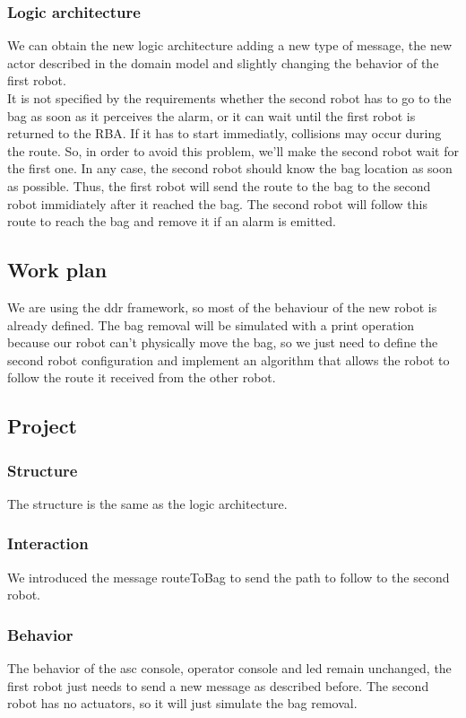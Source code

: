 \documentclass{llncs}
\begin{document}
\subsubsection{Logic architecture}
We can obtain the new logic architecture adding a new type of message, the new actor described in the domain model and slightly changing the behavior of the first robot.\\
It is not specified by the requirements whether the second robot has to go to the bag as soon as it perceives the alarm, or it can wait until the first robot is returned to the RBA. If it has to start immediatly, collisions may occur during the route. So, in order to avoid this problem, we'll make the second robot wait for the first one. In any case, the second robot should know the bag location as soon as possible. Thus, the first robot will send the route to the bag to the second robot immidiately after it reached the bag. The second robot will follow this route to reach the bag and remove it if an alarm is emitted.

\subsection{Work plan}
We are using the ddr framework, so most of the behaviour of the new robot is already defined. The bag removal will be simulated with a print operation because our robot can't physically move the bag, so we just need to define the second robot configuration and implement an algorithm that allows the robot to follow the route it received from the other robot. 
\subsection{Project}
\subsubsection{Structure}
The structure is the same as the logic architecture.
\subsubsection{Interaction}
We introduced the message routeToBag to send the path to follow to the second robot. 
\subsubsection{Behavior}
The behavior of the asc console, operator console and led remain unchanged, the first robot just needs to send a new message as described before. The second robot has no actuators, so it will just simulate the bag removal.

\end{document}
